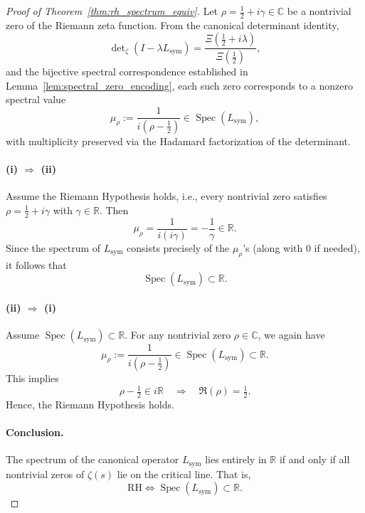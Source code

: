 \begin{proof}[Proof of Theorem~\ref{thm:rh_spectrum_equiv}]
Let \( \rho = \tfrac{1}{2} + i\gamma \in \mathbb{C} \) be a nontrivial zero of the Riemann zeta function. From the canonical determinant identity,
\[
\det\nolimits_\zeta(I - \lambda L_{\mathrm{sym}}) = \frac{\Xi\left( \tfrac{1}{2} + i\lambda \right)}{\Xi\left( \tfrac{1}{2} \right)},
\]
and the bijective spectral correspondence established in Lemma~\ref{lem:spectral_zero_encoding}, each such zero corresponds to a nonzero spectral value
\[
\mu_\rho := \frac{1}{i(\rho - \tfrac{1}{2})} \in \operatorname{Spec}(L_{\mathrm{sym}}),
\]
with multiplicity preserved via the Hadamard factorization of the determinant.

\paragraph{(i) \( \Rightarrow \) (ii)}
Assume the Riemann Hypothesis holds, i.e., every nontrivial zero satisfies \( \rho = \tfrac{1}{2} + i\gamma \) with \( \gamma \in \mathbb{R} \). Then
\[
\mu_\rho = \frac{1}{i(i\gamma)} = -\frac{1}{\gamma} \in \mathbb{R}.
\]
Since the spectrum of \( L_{\mathrm{sym}} \) consists precisely of the \( \mu_\rho \)'s (along with 0 if needed), it follows that
\[
\operatorname{Spec}(L_{\mathrm{sym}}) \subset \mathbb{R}.
\]

\paragraph{(ii) \( \Rightarrow \) (i)}
Assume \( \operatorname{Spec}(L_{\mathrm{sym}}) \subset \mathbb{R} \). For any nontrivial zero \( \rho \in \mathbb{C} \), we again have
\[
\mu_\rho := \frac{1}{i(\rho - \tfrac{1}{2})} \in \operatorname{Spec}(L_{\mathrm{sym}}) \subset \mathbb{R}.
\]
This implies
\[
\rho - \tfrac{1}{2} \in i\mathbb{R} \quad \Longrightarrow \quad \Re(\rho) = \tfrac{1}{2}.
\]
Hence, the Riemann Hypothesis holds.

\paragraph{Conclusion.}
The spectrum of the canonical operator \( L_{\mathrm{sym}} \) lies entirely in \( \mathbb{R} \) if and only if all nontrivial zeros of \( \zeta(s) \) lie on the critical line. That is,
\[
\mathrm{RH} \iff \operatorname{Spec}(L_{\mathrm{sym}}) \subset \mathbb{R}.
\]
\end{proof}
